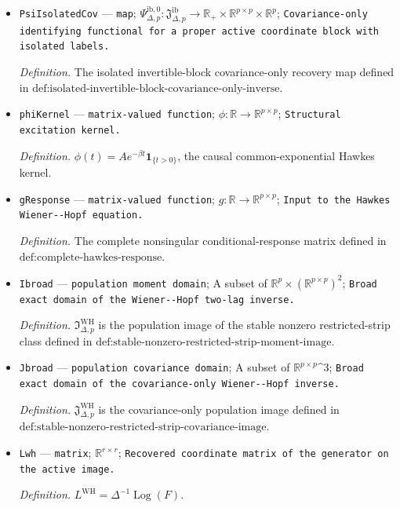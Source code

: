\documentclass{article}
\begin{document}
\begin{itemize}
  \item \texttt{PsiIsolatedCov} --- \texttt{map}; \(\Psi_{\Delta,p}^{\mathrm{ib},0}:\mathfrak J_{\Delta,p}^{\mathrm{ib}}\to\mathbb R_+\times\mathbb R^{p\times p}\times\mathbb R^p\); \texttt{Covariance-\allowbreak{}only identifying functional for a proper active coordinate block with isolated labels.}
  \par\smallskip\noindent\emph{Definition.} The isolated invertible-block covariance-only recovery map defined in \(\text{def:isolated-invertible-block-covariance-only-inverse}\).
  \item \texttt{phiKernel} --- \texttt{matrix-\allowbreak{}valued function}; \(\phi:\mathbb R\to\mathbb R^{p\times p}\); \texttt{Structural excitation kernel.}
  \par\smallskip\noindent\emph{Definition.} \(\phi(t)=Ae^{-\beta t}\mathbf 1_{\{t>0\}}\), the causal common-exponential Hawkes kernel.
  \item \texttt{gResponse} --- \texttt{matrix-\allowbreak{}valued function}; \(g:\mathbb R\to\mathbb R^{p\times p}\); \texttt{Input to the Hawkes Wiener-\allowbreak{}-\allowbreak{}Hopf equation.}
  \par\smallskip\noindent\emph{Definition.} The complete nonsingular conditional-response matrix defined in \(\text{def:complete-hawkes-response}\).
  \item \texttt{Ibroad} --- \texttt{population moment domain}; A subset of \(\mathbb R^p\times(\mathbb R^{p\times p})^2\); \texttt{Broad exact domain of the Wiener-\allowbreak{}-\allowbreak{}Hopf two-\allowbreak{}lag inverse.}
  \par\smallskip\noindent\emph{Definition.} \(\mathfrak I_{\Delta,p}^{\mathrm{WH}}\) is the population image of the stable nonzero restricted-strip class defined in \(\text{def:stable-nonzero-restricted-strip-moment-image}\).
  \item \texttt{Jbroad} --- \texttt{population covariance domain}; A subset of \(\mathbb R^{p\times p}\)\textasciicircum{}3; \texttt{Broad exact domain of the covariance-\allowbreak{}only Wiener-\allowbreak{}-\allowbreak{}Hopf inverse.}
  \par\smallskip\noindent\emph{Definition.} \(\mathfrak J_{\Delta,p}^{\mathrm{WH}}\) is the covariance-only population image defined in \(\text{def:stable-nonzero-restricted-strip-covariance-image}\).
  \item \texttt{Lwh} --- \texttt{matrix}; \(\mathbb R^{r\times r}\); \texttt{Recovered coordinate matrix of the generator on the active image.}
  \par\smallskip\noindent\emph{Definition.} \(L^{\mathrm{WH}}=\Delta^{-1}\operatorname{Log}(F)\).

\end{itemize}
\end{document}
